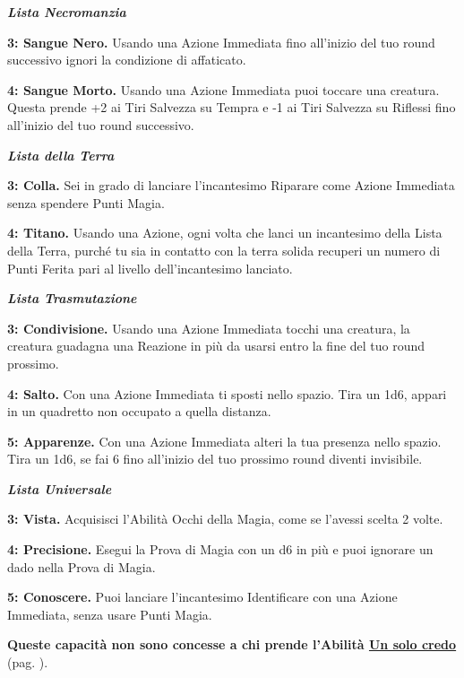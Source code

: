 \begin{multicols}{2}
\emph{\textbf{Lista Necromanzia}}

\textbf{3: Sangue Nero.} Usando una Azione Immediata fino all'inizio del tuo round successivo ignori la condizione di affaticato.

\textbf{4: Sangue Morto.} Usando una Azione Immediata puoi toccare una creatura. Questa prende +2 ai Tiri Salvezza su Tempra e -1 ai Tiri Salvezza su Riflessi fino all'inizio del tuo round successivo.

\emph{\textbf{Lista della Terra}}

\textbf{3: Colla.} Sei in grado di lanciare l'incantesimo Riparare come Azione Immediata senza spendere Punti Magia.

\textbf{4: Titano.} Usando una Azione, ogni volta che lanci un incantesimo della Lista della Terra, purché tu sia in contatto con la terra solida recuperi un numero di Punti Ferita pari al livello dell'incantesimo lanciato.

\emph{\textbf{Lista Trasmutazione}}

\textbf{3: Condivisione.} Usando una Azione Immediata tocchi una creatura, la creatura guadagna una Reazione in più da usarsi entro la fine del tuo round prossimo.

\textbf{4: Salto.} Con una Azione Immediata ti sposti nello spazio. Tira un 1d6, appari in un quadretto non occupato a quella distanza.

\textbf{5: Apparenze.} Con una Azione Immediata alteri la tua presenza nello spazio. Tira un 1d6, se fai 6 fino all'inizio del tuo prossimo round diventi invisibile.

\emph{\textbf{Lista Universale}}

\textbf{3: Vista.} Acquisisci l'Abilità Occhi della Magia, come se l'avessi scelta 2 volte.

\textbf{4: Precisione.} Esegui la Prova di Magia con un d6 in più e puoi ignorare un dado nella Prova di Magia.

\textbf{5: Conoscere.} Puoi lanciare l'incantesimo Identificare con una Azione Immediata, senza usare Punti Magia.

\textbf{Queste capacità non sono concesse a chi prende l'Abilità \hyperlink{Un solo credo}{Un solo credo}} (pag. \pageref{Un solo credo}).





\end{multicols}
